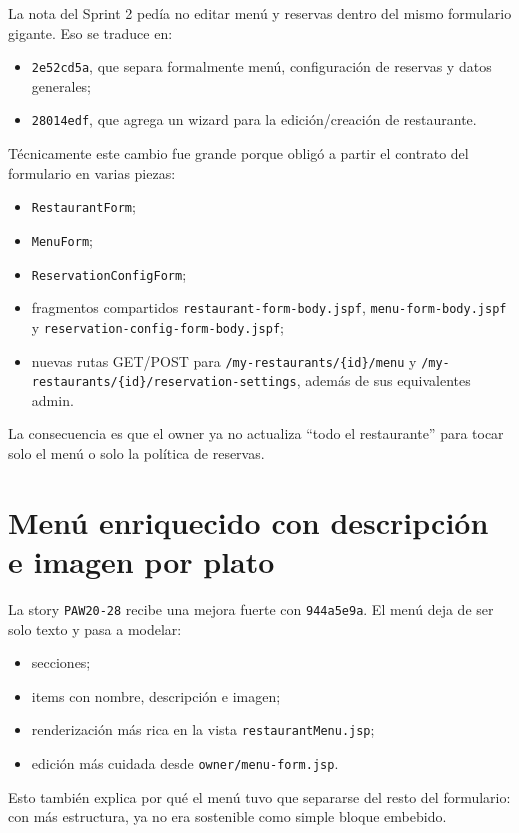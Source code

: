 \documentclass[11pt,a4paper]{report}
\newcommand{\commit}[1]{\texttt{#1}}
\newcommand{\code}[1]{\nolinkurl{#1}}
\newcommand{\story}[1]{\texttt{#1}}
\begin{document}
La nota del Sprint 2 ped\'ia no editar men\'u y reservas dentro del mismo formulario gigante. Eso se traduce en:

\begin{itemize}
  \item \commit{2e52cd5a}, que separa formalmente men\'u, configuraci\'on de reservas y datos generales;
  \item \commit{28014edf}, que agrega un wizard para la edici\'on/creaci\'on de restaurante.
\end{itemize}

T\'ecnicamente este cambio fue grande porque oblig\'o a partir el contrato del formulario en varias piezas:

\begin{itemize}
  \item \code{RestaurantForm};
  \item \code{MenuForm};
  \item \code{ReservationConfigForm};
  \item fragmentos compartidos \code{restaurant-form-body.jspf}, \code{menu-form-body.jspf} y \code{reservation-config-form-body.jspf};
  \item nuevas rutas GET/POST para \code{/my-restaurants/\{id\}/menu} y \code{/my-restaurants/\{id\}/reservation-settings}, adem\'as de sus equivalentes admin.
\end{itemize}

La consecuencia es que el owner ya no actualiza ``todo el restaurante'' para tocar solo el men\'u o solo la pol\'itica de reservas.

\section{Men\'u enriquecido con descripci\'on e imagen por plato}

La story \story{PAW20-28} recibe una mejora fuerte con \commit{944a5e9a}. El men\'u deja de ser solo texto y pasa a modelar:

\begin{itemize}
  \item secciones;
  \item items con nombre, descripci\'on e imagen;
  \item renderizaci\'on m\'as rica en la vista \code{restaurantMenu.jsp};
  \item edici\'on m\'as cuidada desde \code{owner/menu-form.jsp}.
\end{itemize}

Esto tambi\'en explica por qu\'e el men\'u tuvo que separarse del resto del formulario: con m\'as estructura, ya no era sostenible como simple bloque embebido.
\end{document}
